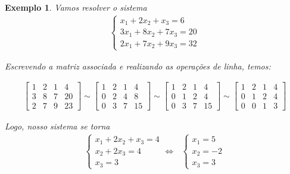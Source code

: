 \documentclass{article}
\newtheorem*{example}{Exemplo}
\begin{document}
\begin{example}
	Vamos resolver o sistema
	\begin{align*}
		\begin{cases} 
		x_1 + 2x_2 + x_3 = 6 \\
		3x_1 + 8x_2 + 7x_3  = 20 \\
		2x_1 + 7x_2 + 9x_3= 32
		\end{cases}
	\end{align*}
	\par\vspace{0.3cm} Escrevendo a matriz associada e realizando as operações de linha, temos:
	
	\begin{align*}
	\begin{bmatrix}
	1 & 2 & 1 & 4 \\
	3 & 8 & 7 & 20 \\
	2 & 7 & 9 & 23
	\end{bmatrix}
	\sim
	\begin{bmatrix}
	1 & 2 & 1 & 4 \\
	0 & 2 & 4 & 8 \\
	0 & 3 & 7 & 15
	\end{bmatrix}
	\sim
	\begin{bmatrix}
	1 & 2 & 1 & 4 \\
	0 & 1 & 2 & 4 \\
	0 & 3 & 7 & 15
	\end{bmatrix}
	\sim
	\begin{bmatrix}
	1 & 2 & 1 & 4 \\
	0 & 1 & 2 & 4 \\
	0 & 0 & 1 & 3
	\end{bmatrix}
	\end{align*}
	\par\vspace{0.3cm} Logo, nosso sistema se torna
	\begin{align*}
	\begin{cases}
	x_1 + 2x_2  + x_3 = 4 \\
	x_2 + 2x_3 = 4 \\
	x_3 = 3
	\end{cases} 
	\Leftrightarrow \text{  }
	\begin{cases}
	x_1 = 5 \\
	x_2 = -2 \\
	x_3 = 3
	\end{cases}
	\end{align*}
\end{example}
\end{document}
